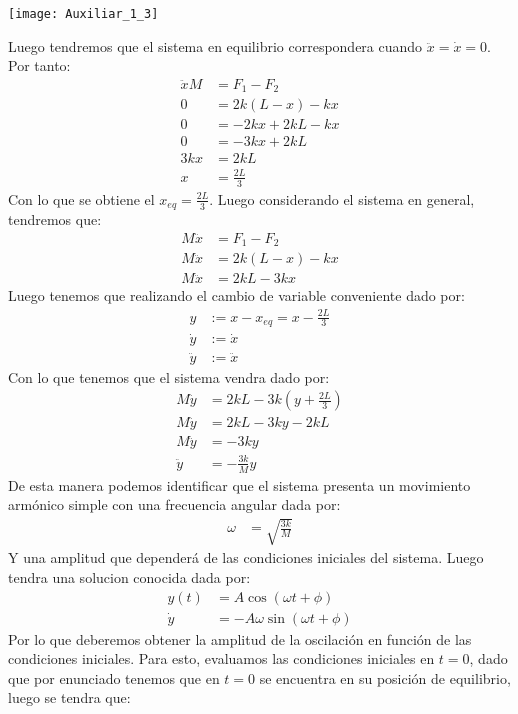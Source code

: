 \documentclass[
  11pt,
  letterpaper,
   addpoints,
   answers
  ]{exam}
\begin{document}
\begin{questions}
\begin{solution}
\begin{center}
    \texttt{[image: Auxiliar\_1\_3]}
\end{center}
Luego tendremos que el sistema en equilibrio correspondera cuando $\ddot{x}=\dot{x}=0$. Por tanto:
\begin{align}
    \ddot{x}M &= F_{1} - F_{2}\\
    0 &= 2k(L-x)- kx\\
    0 &= -2kx + 2kL - kx\\
    0 &= -3kx + 2kL\\
    3kx &= 2kL\\
    x &= \frac{2L}{3}
\end{align}
Con lo que se obtiene el $x_{eq} = \frac{2L}{3}$. Luego considerando el sistema en general, tendremos que:
\begin{align}
    M\ddot{x} &= F_{1} - F_{2}\\
    M\ddot{x} &= 2k(L-x) - kx\\
    M\ddot{x} &= 2kL - 3kx
\end{align}
Luego tenemos que realizando el cambio de variable conveniente dado por:
\begin{align}
    y&:= x - x_{eq} = x - \frac{2L}{3}\\
    \dot{y} &:= \dot{x}\\
    \ddot{y} &:= \ddot{x}
\end{align}
Con lo que tenemos que el sistema vendra dado por:
\begin{align}
    M\ddot{y} &= 2kL - 3k\left(y + \frac{2L}{3}\right)\\
    M\ddot{y} &= 2kL - 3ky - 2kL\\
    M\ddot{y} &= -3ky \\
    \ddot{y} &= -\frac{3k}{M}y
\end{align}
De esta manera podemos identificar que el sistema presenta un movimiento armónico simple con una frecuencia angular dada por:
\begin{align}
    \omega &= \sqrt{\frac{3k}{M}}
\end{align}
Y una amplitud que dependerá de las condiciones iniciales del sistema. Luego tendra una solucion conocida dada por:
\begin{align}
    y(t) &= A \cos(\omega t + \phi)\\
    \dot{y} &= -A \omega \sin(\omega t + \phi)
\end{align}
Por lo que deberemos obtener la amplitud de la oscilación en función de las condiciones iniciales. Para esto, evaluamos las condiciones iniciales en $t=0$, dado que por enunciado tenemos que en $t=0$ se encuentra en su posición de equilibrio, luego se tendra que:

\end{solution}
\end{questions}
\end{document}
